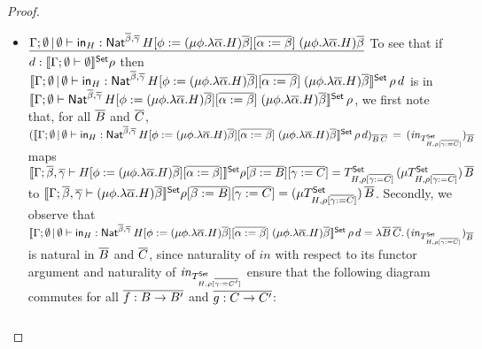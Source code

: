 \documentclass[acmsmall,review,anonymous]{acmart}
\theoremstyle{definition}
\newcommand{\set}{\mathsf{Set}}
\begin{document}
\begin{proof}
\begin{itemize}
\item
$\underline{\Gamma;\emptyset \,|\, \emptyset \vdash \mathsf{in}_H :
  \mathsf{Nat}^{\overline{\beta},\overline{\gamma}} \, H[\phi := (\mu \phi.\lambda
    {\overline \alpha}.H){\overline \beta}][\overline{\alpha := \beta}]
  \;(\mu \phi.\lambda {\overline \alpha}.H){\overline \beta}}$\; To
  see that if $d : \setsem{\Gamma;\emptyset \vdash \emptyset} \rho$
  then $\setsem{\Gamma;\emptyset \,|\, \emptyset \vdash \tin_H :
    \Nat^{\ol{\beta},\ol{\gamma}} \, H[\phi := (\mu \phi.\lambda
      {\overline \alpha}.H){\overline \beta}][\ol{\alpha := \beta}]
    \;(\mu \phi.\lambda {\overline \alpha}.H){\overline \beta}}\,
  \rho\,d$ is in\\ $\setsem{\Gamma;\emptyset \vdash
    \Nat^{\ol{\beta},\ol{\gamma}} \, H[\phi := (\mu \phi.\lambda
      {\overline \alpha}.H){\overline \beta}][\ol{\alpha := \beta}]
    \;(\mu \phi.\lambda {\overline \alpha}.H){\overline \beta}}\,
  \rho$, we first note that, for all $\overline{B}$ and $\overline{C}$,
  $(\setsem{\Gamma;\emptyset \,|\, \emptyset \vdash \tin_H :
    \Nat^{\ol{\beta},\ol{\gamma}} \, H[\phi := (\mu \phi.\lambda
      {\overline \alpha}.H){\overline \beta}][\ol{\alpha := \beta}]
    \;(\mu \phi.\lambda {\overline \alpha}.H){\overline \beta}}\,
  \rho\,d)_{\ol{B}\,\ol{C}}\, =\,
  (\mathit{in}_{T^\set_{H,\rho[\ol{\gamma := C}]}})_{\ol{B}}$ maps
  $\setsem{\Gamma;\ol{\beta},\ol{\gamma} \vdash H[\phi := (\mu
      \phi.\lambda {\overline \alpha}.H){\overline \beta}][\ol{\alpha
        := \beta}]}\rho[\ol{\beta := B}][\ol{\gamma := C}] =
  T^\set_{H,\rho[\ol{\gamma := C}]}\, (\mu T^\set_{H,\rho[\ol{\gamma
        := C}]}) \, \ol{B}$ to $\setsem{\Gamma;\ol{\beta},\ol{\gamma}
    \vdash (\mu \phi.\lambda {\overline \alpha}.H){\overline \beta}}
  \rho[\ol{\beta := B}][\ol{\gamma := C}] = (\mu
  T^\set_{H,\rho[\ol{\gamma := C}]}) \, \ol{B}$. Secondly, we observe
  that\\ $\setsem{\Gamma;\emptyset \,|\, \emptyset \vdash \tin_H :
    \Nat^{\ol{\beta},\ol{\gamma}} \, H[\phi := (\mu \phi.\lambda
      {\overline \alpha}.H){\overline \beta}][\ol{\alpha := \beta}]
    \;(\mu \phi.\lambda {\overline \alpha}.H){\overline
      \beta}}\,\rho\,d = \lambda
  \ol{B}\,\ol{C}.\,(\mathit{in}_{T^\set_{H,\rho[\ol{\gamma :=
          C}]}})_{\ol{B}}$ is natural in $\overline{B}$ and $\overline{C}$, since
  naturality of $\mathit{in}$ with respect to its functor argument and
  naturality of $\mathit{in}_{T^\set_{H,\rho[\ol{\gamma := C'}]}}$ ensure
  that the following diagram commutes for all $\overline{f : B \to B'}$ and
  $\overline{g : C \to C'}$:
{\tiny
  \[\begin{tikzcd}[column sep=2.5in, row sep=0.75in]

\end{tikzcd}\]}
\end{itemize}
\end{proof}
\end{document}
